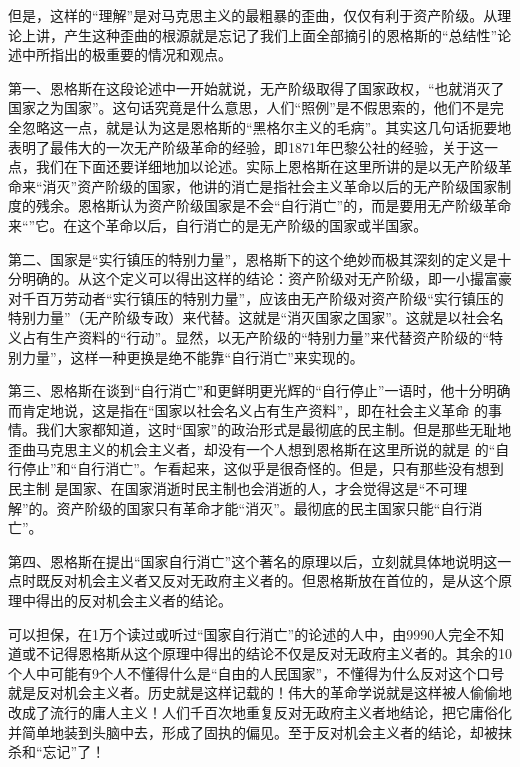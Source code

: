 但是，这样的“理解”是对马克思主义的最粗暴的歪曲，仅仅有利于资产阶级。从理论上讲，产生这种歪曲的根源就是忘记了我们上面全部摘引的恩格斯的“总结性”论述中所指出的极重要的情况和观点。

第一、恩格斯在这段论述中一开始就说，无产阶级取得了国家政权，“也就消灭了国家之为国家”。这句话究竟是什么意思，人们“照例”是不假思索的，他们不是完全忽略这一点，就是认为这是恩格斯的“黑格尔主义的毛病”。其实这几句话扼要地表明了最伟大的一次无产阶级革命的经验，即1871年巴黎公社的经验，关于这一点，我们在下面还要详细地加以论述。实际上恩格斯在这里所讲的是以无产阶级革命来“消灭”{\kaishu 资产阶级}的国家，他讲的消亡是指社会主义革命{\kaishu 以后的无产阶级}国家制度的残余。恩格斯认为资产阶级国家是不会“自行消亡”的，而是要用无产阶级革命来“”它。在这个革命以后，自行消亡的是无产阶级的国家或半国家。

第二、国家是“实行镇压的特别力量”，恩格斯下的这个绝妙而极其深刻的定义是十分明确的。从这个定义可以得出这样的结论：资产阶级对无产阶级，即一小撮富豪对千百万劳动者“实行镇压的特别力量”，应该由无产阶级对资产阶级“实行镇压的特别力量”（无产阶级专政）来代替。这就是“消灭国家之国家”。这就是以社会名义占有生产资料的“行动”。显然，以无产阶级的“特别力量”来代替资产阶级的“特别力量”，这样一种更换是绝不能靠“自行消亡”来实现的。

第三、恩格斯在谈到“自行消亡”和更鲜明更光辉的“自行停止”一语时，他十分明确而肯定地说，这是指在“国家以社会名义占有生产资料”，即在社会主义革命 的事情。我们大家都知道，这时“国家”的政治形式是最彻底的民主制。但是那些无耻地歪曲马克思主义的机会主义者，却没有一个人想到恩格斯在这里所说的就是 的“自行停止”和“自行消亡”。乍看起来，这似乎是很奇怪的。但是，只有那些没有想到民主制 是国家、在国家消逝时民主制也会消逝的人，才会觉得这是“不可理解”的。资产阶级的国家只有革命才能“消灭”。最彻底的民主国家只能“自行消亡”。

第四、恩格斯在提出“国家自行消亡”这个著名的原理以后，立刻就具体地说明这一点时既反对机会主义者又反对无政府主义者的。但恩格斯放在首位的，是从这个原理中得出的反对机会主义者的结论。

可以担保，在1万个读过或听过“国家自行消亡”的论述的人中，由9990人完全不知道或不记得恩格斯从这个原理中得出的结论{\kaishu 不仅}是反对无政府主义者的。其余的10个人中可能有9个人不懂得什么是“自由的人民国家”，不懂得为什么反对这个口号就是反对机会主义者。历史就是这样记载的！伟大的革命学说就是这样被人偷偷地改成了流行的庸人主义！人们千百次地重复反对无政府主义者地结论，把它庸俗化并简单地装到头脑中去，形成了固执的偏见。至于反对机会主义者的结论，却被抹杀和“忘记”了！

